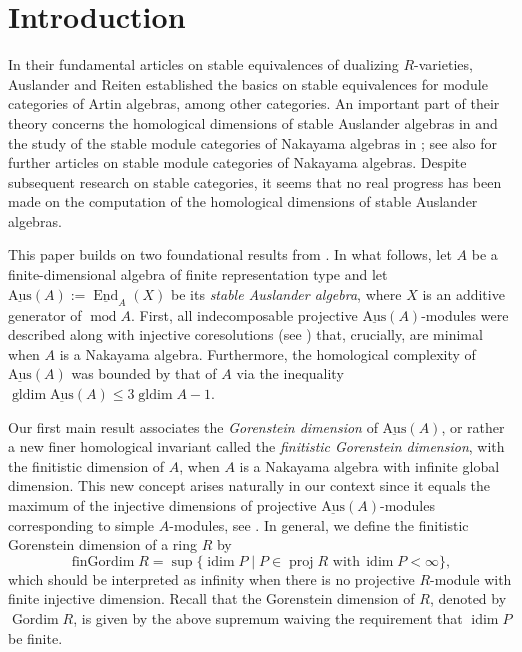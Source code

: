 \documentclass[a4paper]{amsart}
\theoremstyle{definition}
\theoremstyle{remark}
\numberwithin{equation}{theorem}
\newcommand{\Dfn}[1]{\emph{\color{blue}#1}} %
\renewcommand{\mod}{\operatorname{mod}}
\newcommand{\proj}{\operatorname{proj}}
\newcommand{\End}{\operatorname{End}}
\newcommand{\sAus}{\operatorname{\underline{Aus}}}
\newcommand{\gordim}{\operatorname{Gordim}}
\newcommand{\fingordim}{\operatorname{finGordim}}
\newcommand{\idim}{\operatorname{idim}}
\newcommand{\gldim}{\operatorname{gldim}}
\begin{document}
\setcounter{tocdepth}{1}
\tableofcontents

\section{Introduction}
In their fundamental articles \cite{AR1,AR2,AR3,AR4,AR5,R1} on stable equivalences of dualizing $ R $-varieties, Auslander and Reiten established the basics on stable equivalences for module categories of Artin algebras, among other categories.
An important part of their theory concerns the homological dimensions of stable Auslander algebras in \cite{AR4} and the study of the stable module categories of Nakayama algebras in \cite{R1}; see also \cite{R2,R3} for further articles on stable module categories of Nakayama algebras.
Despite subsequent research on stable categories, it seems that no real progress has been made on the computation of the homological dimensions of stable Auslander algebras.




This paper builds on two foundational results from \cite{AR}.
In what follows, let $ A $ be a finite-dimensional algebra of finite representation type and let $\sAus(A):= \underline{\End}_A(X)$ be its \emph{stable Auslander algebra}, where $X$ is an additive generator of $\mod A$.
First, all indecomposable projective $ \sAus(A)$-modules were described along with injective coresolutions (see ) that, crucially, are minimal when $ A $ is a Nakayama algebra. Furthermore, the homological complexity of $ \sAus(A) $ was bounded by that of $ A $ via the inequality $ \gldim \sAus(A) \leq 3 \gldim A - 1 $.




Our first main result associates the \emph{Gorenstein dimension} of $ \sAus(A) $, or rather a new finer homological invariant called the \Dfn{finitistic Gorenstein dimension}, with the finitistic dimension of $ A $, when $ A $ is a Nakayama algebra with infinite global dimension.
This new concept arises naturally in our context since it equals the maximum of the injective dimensions of projective $ \sAus(A) $-modules corresponding to simple $A$-modules, see .
In general, we define the finitistic Gorenstein dimension of a ring $ R $ by
        \[
            \fingordim R = \sup \bigl\{ \idim P \mid P \in \proj R  \text{ with} \, \idim P < \infty \bigr\} ,
        \]
which should be interpreted as infinity when there is no projective $ R $-module with finite injective dimension. Recall that the Gorenstein dimension of $ R $, denoted by $ \gordim R $, is given by the above supremum waiving the requirement that $ \idim P $ be finite.
\end{document}
